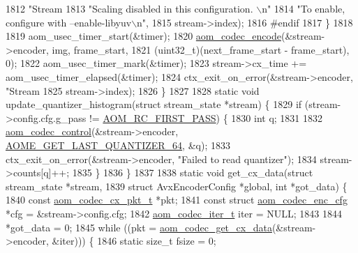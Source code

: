 \begin{DoxyCodeInclude}
{{{{{{{{{{{{{{{{{{{{{{{{{{{{{{{{{{1812                       \textcolor{stringliteral}{"Stream %
1813                       \textcolor{stringliteral}{"Scaling disabled in this configuration. \(\backslash\)n"}
1814                       \textcolor{stringliteral}{"To enable, configure with --enable-libyuv\(\backslash\)n"},
1815                       stream->index);
1816 \textcolor{preprocessor}{#endif}
1817   \}
1818 
1819   aom\_usec\_timer\_start(&timer);
1820   \hyperlink{group__encoder_ga6f4a777de5389771e783df7ff1f116d4}{aom\_codec\_encode}(&stream->encoder, img, frame\_start,
1821                    (uint32\_t)(next\_frame\_start - frame\_start), 0);
1822   aom\_usec\_timer\_mark(&timer);
1823   stream->cx\_time += aom\_usec\_timer\_elapsed(&timer);
1824   ctx\_exit\_on\_error(&stream->encoder, \textcolor{stringliteral}{"Stream %
1825                     stream->index);
1826 \}
1827 
1828 \textcolor{keyword}{static} \textcolor{keywordtype}{void} update\_quantizer\_histogram(\textcolor{keyword}{struct} stream\_state *stream) \{
1829   \textcolor{keywordflow}{if} (stream->config.cfg.g\_pass != \hyperlink{group__encoder_gga92b6709b58dc3435e3ba652da562eda1ad342b33a290482c20238bfde5d9bea1e}{AOM\_RC\_FIRST\_PASS}) \{
1830     \textcolor{keywordtype}{int} q;
1831 
1832     \hyperlink{group__codec_ga6da974f4eeaba1fa74106b28d0fe6ac5}{aom\_codec\_control}(&stream->encoder, 
      \hyperlink{group__aom__encoder_ggae78dde67a6d78f332e9bdba0dde42db5a17b924cadd3c942f9e57fe6fc4d5e2ab}{AOME\_GET\_LAST\_QUANTIZER\_64}, &q);
1833     ctx\_exit\_on\_error(&stream->encoder, \textcolor{stringliteral}{"Failed to read quantizer"});
1834     stream->counts[q]++;
1835   \}
1836 \}
1837 
1838 \textcolor{keyword}{static} \textcolor{keywordtype}{void} get\_cx\_data(\textcolor{keyword}{struct} stream\_state *stream,
1839                         \textcolor{keyword}{struct} AvxEncoderConfig *global, \textcolor{keywordtype}{int} *got\_data) \{
1840   \textcolor{keyword}{const} \hyperlink{structaom__codec__cx__pkt}{aom\_codec\_cx\_pkt\_t} *pkt;
1841   \textcolor{keyword}{const} \textcolor{keyword}{struct }\hyperlink{structaom__codec__enc__cfg}{aom\_codec\_enc\_cfg} *cfg = &stream->config.cfg;
1842   \hyperlink{group__codec_gadf9e173c9e02788a9999399edab20a02}{aom\_codec\_iter\_t} iter = NULL;
1843 
1844   *got\_data = 0;
1845   \textcolor{keywordflow}{while} ((pkt = \hyperlink{group__encoder_gaedc4c56b60d4217677cb561066360884}{aom\_codec\_get\_cx\_data}(&stream->encoder, &iter))) \{
1846     \textcolor{keyword}{static} \textcolor{keywordtype}{size\_t} fsize = 0;
}}}}}}}}}}}}}}}}}}}}}}}}}}}}}}}}}}}}
\end{DoxyCodeInclude}

